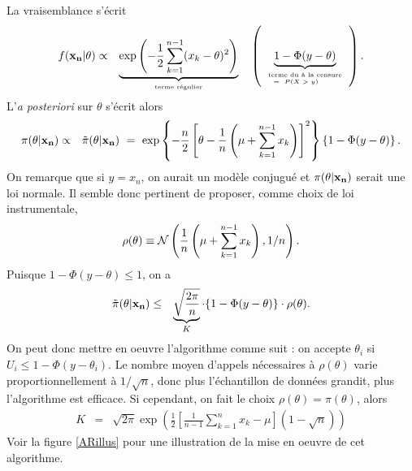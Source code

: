 \begin{rep}%
La vraisemblance s'écrit  
\begin{eqnarray*}
f({\bf x_n}|\theta) & \propto & \underbrace{\exp\left(-\frac{1}{2}\sum\limits_{k=1}^{n-1} (x_k-\theta)^2\right)}_{\text{\tiny terme régulier}} \ \ \ \left(\underbrace{1-\Phi(y-\theta)}_{\text{\tiny \begin{tabular}{l} terme dû à la censure \\ $\ \ = \ P(X>y)$ \end{tabular}}}\right).  
\end{eqnarray*}
L'{\it a posteriori} sur $\theta$ s'écrit alors
\begin{eqnarray*}
\pi(\theta|{\bf x_n}) & \propto & \tilde{\pi}(\theta|{\bf x_n}) \ = \ \exp\left\{-\frac{n}{2}\left[\theta - \frac{1}{n}\left(\mu + \sum\limits_{k=1}^{n-1} x_k\right)\right]^2\right\}\left\{1-\Phi(y-\theta)\right\}. 
\end{eqnarray*}
On remarque que si $y=x_n$, on aurait un modèle conjugué et $\pi(\theta|{\bf x_n})$ serait une loi normale. Il semble donc pertinent de proposer, comme choix de loi instrumentale,
$$
\rho(\theta) \equiv {\cal{N}}\left(\frac{1}{n}\left(\mu + \sum\limits_{k=1}^{n-1} x_k\right),1/n\right).
$$
Puisque $1-\Phi(y-\theta)\leq 1$, on a
\begin{eqnarray*}
\tilde{\pi}(\theta|{\bf x_n}) & \leq & \underbrace{\sqrt{\frac{2\pi}{n}}}_{K} \cdot\{1-\Phi(y-\theta)\}\cdot\rho(\theta).
\end{eqnarray*}
On peut donc mettre en oeuvre l'algorithme comme suit : on accepte $\theta_i$ si $U_i\leq 1-\Phi(y-\theta_i)$. Le nombre moyen d'appels nécessaires à $\rho(\theta)$ varie proportionnellement à $1/\sqrt{n}$, donc
plus l'échantillon de données grandit, plus l'algorithme est efficace.
Si cependant, on fait le choix $\rho(\theta)=\pi(\theta)$, alors
\begin{eqnarray*}
K & = & \sqrt{2\pi}\exp\left(\frac{1}{2}\left[\frac{1}{n-1}\sum\limits_{k=1}^n x_k - \mu\right](1-\sqrt{n})\right) 
\end{eqnarray*}
Voir la figure \ref{ARillus} pour une illustration de la mise en oeuvre de cet algorithme.
\end{rep}


